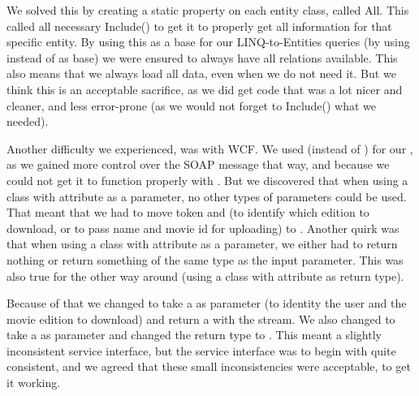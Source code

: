 We solved this by creating a static property on each entity class, called All. This called all necessary Include() to get it to properly get all information for that specific entity. By using this as a base for our LINQ-to-Entities queries (by using  instead of  as base) we were ensured to always have all relations available. This also means that we always load all data, even when we do not need it. But we think this is an acceptable sacrifice, as we did get code that was a lot nicer and cleaner, and less error-prone (as we would not forget to Include() what we needed).

Another difficulty we experienced, was with WCF. We used  (instead of ) for our , as we gained more control over the SOAP message that way, and because we could not get it to function properly with . But we discovered that when using a class with  attribute as a parameter, no other types of parameters could be used. That meant that we had to move token and  (to identify which edition to download, or to pass name and movie id for uploading) to . Another quirk was that when using a class with  attribute as a parameter, we either had to return nothing or return something of the same type as the input parameter. This was also true for the other way around (using a class with  attribute as return type).

Because of that we changed  to take a   as parameter (to identity the user and the movie edition to download) and return a   with the stream. We also changed  to take a  as parameter and changed the return type to . This meant a slightly inconsistent service interface, but the service interface was to begin with quite consistent, and we agreed that these small inconsistencies were acceptable, to get it working.